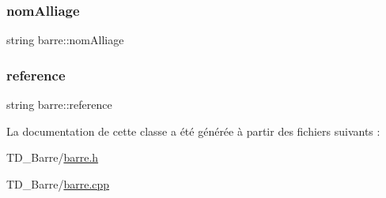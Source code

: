 \subsubsection{\texorpdfstring{nom\+Alliage}{nomAlliage}}
{\footnotesize\ttfamily string barre\+::nom\+Alliage\hspace{0.3cm}{\ttfamily [protected]}}

\mbox{\label{classbarre_a078de0af40f717a1ab145687bda7928d}} 
\subsubsection{\texorpdfstring{reference}{reference}}
{\footnotesize\ttfamily string barre\+::reference\hspace{0.3cm}{\ttfamily [protected]}}



La documentation de cette classe a été générée à partir des fichiers suivants \+:\begin{DoxyCompactItemize}
\item 
T\+D\+\_\+\+Barre/\hyperlink{barre_8h}{barre.\+h}\item 
T\+D\+\_\+\+Barre/\hyperlink{barre_8cpp}{barre.\+cpp}\end{DoxyCompactItemize}

